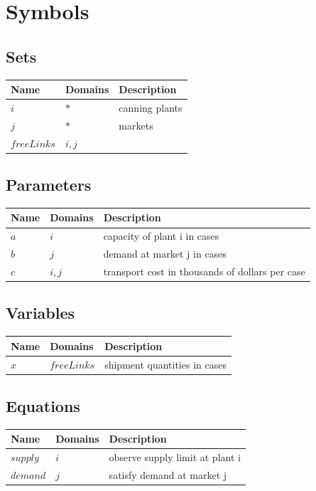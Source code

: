 \documentclass[11pt]{article}
\begin{document}
\section*{Symbols}


\subsection*{Sets}
\begin{tabularx}{\textwidth}{| l | l | X |}
\hline
\textbf{Name} & \textbf{Domains} & \textbf{Description}\\
\hline
\endhead

$i$ & $*$ & canning plants\\
$j$ & $*$ & markets\\
$freeLinks$ & $i,j$ & \\
\hline
\end{tabularx}
\subsection*{Parameters}
\begin{tabularx}{\textwidth}{| l | l | X |}
\hline
\textbf{Name} & \textbf{Domains} & \textbf{Description}\\
\hline
\endhead

$a$ & $i$ & capacity of plant i in cases\\
$b$ & $j$ & demand at market j in cases\\
$c$ & $i,j$ & transport cost in thousands of dollars per case\\
\hline
\end{tabularx}
\subsection*{Variables}
\begin{tabularx}{\textwidth}{| l | l | X |}
\hline
\textbf{Name} & \textbf{Domains} & \textbf{Description}\\
\hline
\endhead

$x$ & $freeLinks$ & shipment quantities in cases\\
\hline
\end{tabularx}
\subsection*{Equations}
\begin{tabularx}{\textwidth}{| l | l | X |}
\hline
\textbf{Name} & \textbf{Domains} & \textbf{Description}\\
\hline
\endhead

$supply$ & $i$ & observe supply limit at plant i\\
$demand$ & $j$ & satisfy demand at market j\\
\hline
\end{tabularx}
\end{document}
